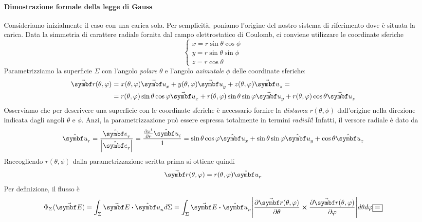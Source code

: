 \paragraph{Dimostrazione formale della legge di Gauss}
\begin{demonstration}
	Consideriamo inizialmente il caso con una carica sola. Per semplicità, poniamo l'origine del nostro sistema di riferimento dove è situata la carica. Data la simmetria di carattere radiale fornita dal campo elettrostatico di Coulomb, ci conviene utilizzare le coordinate sferiche
	\begin{equation*}
		\begin{cases}
			x=r\sin\theta\cos\phi\\
			y=r\sin\theta\sin\phi\\
			z=r\cos\theta
		\end{cases}
	\end{equation*}
	Parametrizziamo la superficie $\Sigma$ con l'angolo \textit{polare} $\theta$ e l'angolo \textit{azimutale} $\phi$ delle coordinate sferiche:
	\begin{align*}
		\vba{r}(\theta,\phi)&=x(\theta,\phi)\vba{u}_x+y(\theta,\phi)\vba{u}_y+z(\theta,\phi)\vba{u}_z=\\
		&=r(\theta,\phi)\sin\theta\cos\phi\vba{u}_x+r(\theta,\phi)\sin\theta\sin\phi\vba{u}_y+r(\theta,\phi)\cos\theta\vba{u}_z
	\end{align*}
	Osserviamo che per descrivere una superficie con le coordinate sferiche è necessario fornire la \textit{distanza} $r(\theta,\phi)$ dall'origine nella direzione indicata dagli angoli $\theta$ e $\phi$. Anzi, la parametrizzazione può essere espressa totalmente in termini \textit{radiali}! Infatti, il versore radiale è dato da
	\begin{equation*}
		\vbh{u}_r=\frac{\vbh{e}_r}{\abs{\vbh{e}_r}}=\frac{\pdv{x^i}{r}\vbh{u}_i}{1}=\sin\theta\cos\phi\vbh{u}_x+\sin\theta\sin\phi\vbh{u}_y+\cos\theta\vbh{u}_z
	\end{equation*}
	Raccogliendo $r(\theta,\phi)$ dalla parametrizzazione scritta prima si ottiene quindi
	\begin{equation*}
		\vba{r}(\theta,\phi)=r(\theta,\phi)\vbh{u}_r
	\end{equation*}
	Per definizione, il flusso è
	\begin{equation*}
		\Phi_{\Sigma}(\vba{E})=\int_{\Sigma}\vba{E}\vdot\vbh{u}_nd\Sigma=\int_{\Sigma}\vba{E}\vdot\vbh{u}_n\abs{\pdv{\vba{r}(\theta,\phi)}{\theta}\cross\pdv{\vba{r}(\theta,\phi)}{\phi}}d\theta d\phi\squarequal
	\end{equation*}

\end{demonstration}
